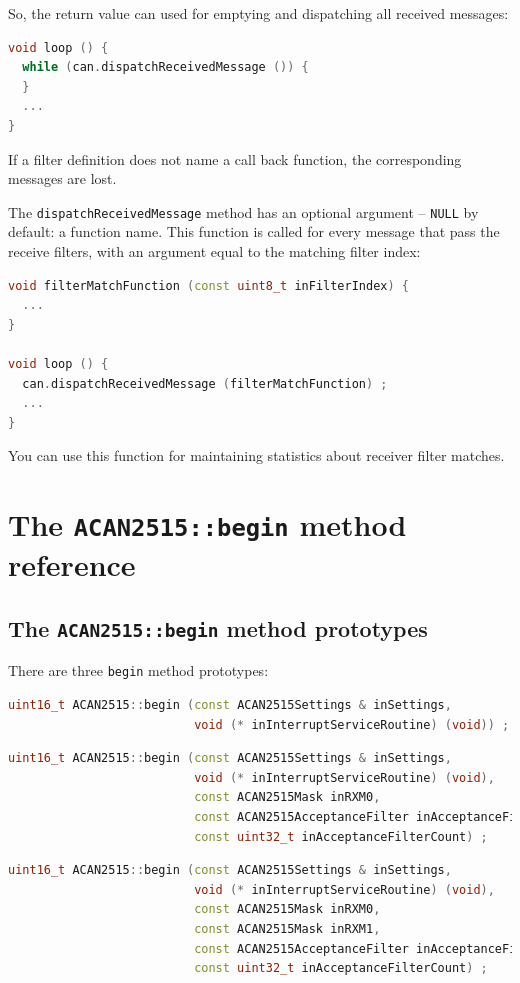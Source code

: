 \documentclass[10pt, a4paper, obeyspaces]{extarticle}
\newcommand \sectionLabel[2]{\section{#1}\label{sec:#2}}
\begin{document}
So, the return value can used for emptying and dispatching all received messages:
{ \small\begin{lstlisting}[language=c++]
void loop () {
  while (can.dispatchReceivedMessage ()) {
  }
  ...
}
\end{lstlisting}}

If a filter definition does not name a call back function, the corresponding messages are lost.

The \texttt{dispatchReceivedMessage} method has an optional argument -- \texttt{NULL} by default: a function name. This function is called for every message that pass the receive filters, with an argument equal to the matching filter index:

{ \small\begin{lstlisting}[language=c++]
void filterMatchFunction (const uint8_t inFilterIndex) {
  ...
}

void loop () {
  can.dispatchReceivedMessage (filterMatchFunction) ;
  ...
}
\end{lstlisting}}

You can use this function for maintaining statistics about receiver filter matches.


\sectionLabel{The \texttt{ACAN2515::begin} method reference}{beginMethodReference}

\subsection{The \texttt{ACAN2515::begin} method prototypes}

There are three \texttt{begin} method prototypes:
{ \small\begin{lstlisting}[language=c++]
uint16_t ACAN2515::begin (const ACAN2515Settings & inSettings,
                          void (* inInterruptServiceRoutine) (void)) ;
\end{lstlisting}}

{ \small\begin{lstlisting}[language=c++]
uint16_t ACAN2515::begin (const ACAN2515Settings & inSettings,
                          void (* inInterruptServiceRoutine) (void),
                          const ACAN2515Mask inRXM0,
                          const ACAN2515AcceptanceFilter inAcceptanceFilters [],
                          const uint32_t inAcceptanceFilterCount) ;
\end{lstlisting}}

{ \small\begin{lstlisting}[language=c++]
uint16_t ACAN2515::begin (const ACAN2515Settings & inSettings,
                          void (* inInterruptServiceRoutine) (void),
                          const ACAN2515Mask inRXM0,
                          const ACAN2515Mask inRXM1,
                          const ACAN2515AcceptanceFilter inAcceptanceFilters [],
                          const uint32_t inAcceptanceFilterCount) ;
\end{lstlisting}}
\end{document}
